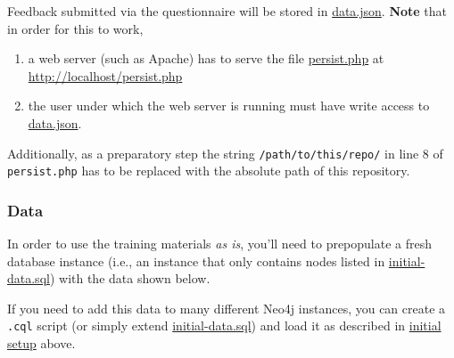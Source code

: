 \documentclass[11pt]{article}
\begin{document}
Feedback submitted via the questionnaire will be stored in
\href{training-materials/questionaire/answers/data.json}{data.json}. \textbf{Note} that in order for this to work,

\begin{enumerate}
\item a web server (such as Apache) has to serve the file \href{training-materials/questionaire/persist.php}{persist.php}
      at \url{http://localhost/persist.php}
\item the user under which the web server is running must have write
access to \href{training-materials/questionaire/answers/data.json}{data.json}.
\end{enumerate}

Additionally, as a preparatory step the string
\texttt{/path/to/this/repo/} in line 8 of \texttt{persist.php} has to be
replaced with the absolute path of this repository.

\subsubsection{Data}
\label{sec-3-4-1}
In order to use the training materials \emph{as is}, you'll need to
prepopulate a fresh database instance (i.e., an instance that only
contains nodes listed in \href{initial-data.cql}{initial-data.sql}) with the data shown
below.

If you need to add this data to many different Neo4j instances,
you can create a \texttt{.cql} script (or simply extend \href{initial-data.cql}{initial-data.sql})
and load it as described in \href{https://github.com/itsjeyd/ODE#initial-setup}{initial setup} above.
\end{document}
